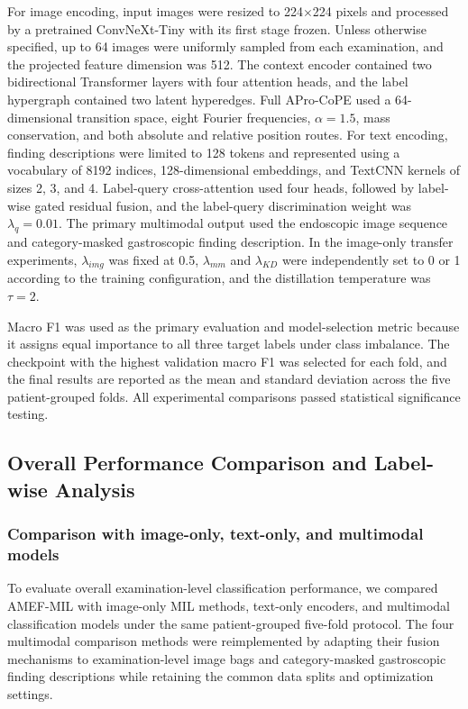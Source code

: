 \documentclass[Afour,sagev,times]{sagej}
\begin{document}
For image encoding, input images were resized to 224$\times$224 pixels and processed by a pretrained ConvNeXt-Tiny with its first stage frozen. Unless otherwise specified, up to 64 images were uniformly sampled from each examination, and the projected feature dimension was 512. The context encoder contained two bidirectional Transformer layers with four attention heads, and the label hypergraph contained two latent hyperedges. Full APro-CoPE used a 64-dimensional transition space, eight Fourier frequencies, $\alpha=1.5$, mass conservation, and both absolute and relative position routes. For text encoding, finding descriptions were limited to 128 tokens and represented using a vocabulary of 8192 indices, 128-dimensional embeddings, and TextCNN kernels of sizes 2, 3, and 4. Label-query cross-attention used four heads, followed by label-wise gated residual fusion, and the label-query discrimination weight was $\lambda_q=0.01$. The primary multimodal output used the endoscopic image sequence and category-masked gastroscopic finding description. In the image-only transfer experiments, $\lambda_{img}$ was fixed at 0.5, $\lambda_{mm}$ and $\lambda_{KD}$ were independently set to 0 or 1 according to the training configuration, and the distillation temperature was $\tau=2$.

Macro F1 was used as the primary evaluation and model-selection metric because it assigns equal importance to all three target labels under class imbalance. The checkpoint with the highest validation macro F1 was selected for each fold, and the final results are reported as the mean and standard deviation across the five patient-grouped folds. All experimental comparisons passed statistical significance testing.

\subsection{Overall Performance Comparison and Label-wise Analysis}

\subsubsection{Comparison with image-only, text-only, and multimodal models}

To evaluate overall examination-level classification performance, we compared AMEF-MIL with image-only MIL methods, text-only encoders, and multimodal classification models under the same patient-grouped five-fold protocol. The four multimodal comparison methods were reimplemented by adapting their fusion mechanisms to examination-level image bags and category-masked gastroscopic finding descriptions while retaining the common data splits and optimization settings.\cite{R29,R30,R31,R32}
\end{document}
